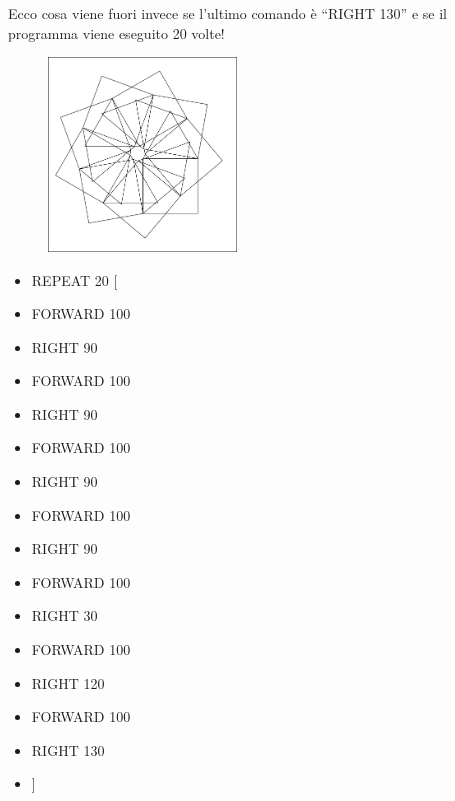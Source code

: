 Ecco cosa viene fuori invece se l’ultimo comando è “RIGHT 130” e se il
programma viene eseguito 20 volte!

\begin{minipage}{0.5\textwidth}
\begin{figure}[H]
   \includegraphics[width=5.0cm,trim=4 4 6 4,clip]{./images/marta/mar-8.png}
   \label{mar-8}
\end{figure}
\end{minipage} \hfill
\begin{minipage}{0.45\textwidth}
\begin{itemize}[itemsep=-3pt,parsep=2pt]
\item[] \hspace{0.5cm} REPEAT 20 [
\item[] \hspace{0.5cm} 	FORWARD 100
\item[] \hspace{0.5cm} 	RIGHT 90
\item[] \hspace{0.5cm} 	FORWARD 100
\item[] \hspace{0.5cm} 	RIGHT 90
\item[] \hspace{0.5cm} 	FORWARD 100
\item[] \hspace{0.5cm} 	RIGHT 90
\item[] \hspace{0.5cm} 	FORWARD 100
\item[] \hspace{0.5cm} 	RIGHT 90
\item[] \hspace{0.5cm} 	FORWARD 100
\item[] \hspace{0.5cm} 	RIGHT 30
\item[] \hspace{0.5cm} 	FORWARD 100
\item[] \hspace{0.5cm} 	RIGHT 120
\item[] \hspace{0.5cm} 	FORWARD 100
\item[] \hspace{0.5cm} 	RIGHT 130
\item[] \hspace{0.5cm}  ]
\end{itemize}          	          
\end{minipage}


